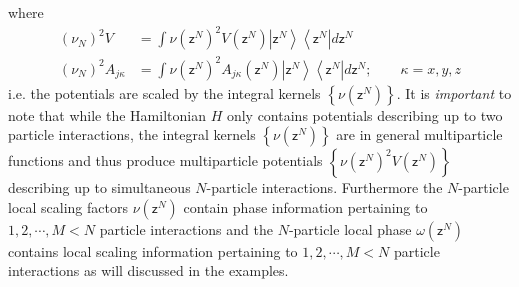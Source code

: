 \documentclass[aps,preprint]{revtex4}%
\begin{document}
where
\begin{align}
\left(  \nu_{N}\right)  ^{2}V &  =\int\nu\left(  \mathsf{z}^{N}\right)
^{2}V\left(  \mathsf{z}^{N}\right)  \left\vert \mathsf{z}^{N}\right\rangle
\left\langle \mathsf{z}^{N}\right\vert d\mathsf{z}^{N}\nonumber\\
\left(  \nu_{N}\right)  ^{2}A_{j\kappa} &  =\int\nu\left(  \mathsf{z}%
^{N}\right)  ^{2}A_{j\kappa}\left(  \mathsf{z}^{N}\right)  \left\vert
\mathsf{z}^{N}\right\rangle \left\langle \mathsf{z}^{N}\right\vert
d\mathsf{z}^{N};\qquad\kappa=x,y,z
\end{align}
i.e. the potentials are scaled by the integral kernels $\left\{  \nu\left(
\mathsf{z}^{N}\right)  \right\}  $. It is \emph{important }to note that while
the Hamiltonian $H$ only contains potentials describing up to two particle
interactions, the integral kernels $\left\{  \nu\left(  \mathsf{z}^{N}\right)
\right\}  $ are in general multiparticle functions and thus produce
multiparticle potentials $\left\{  \nu\left(  \mathsf{z}^{N}\right)
^{2}V\left(  \mathsf{z}^{N}\right)  \right\}  $ describing up to simultaneous
$N$-particle interactions. Furthermore the $N$-particle local scaling factors
$\nu\left(  \mathsf{z}^{N}\right)  $ contain phase information pertaining to
$1,2,\cdots,M<N$ particle interactions and the $N$-particle local phase
$\omega\left(  \mathsf{z}^{N}\right)  $ contains local scaling information
pertaining to $1,2,\cdots,M<N$ particle interactions as will discussed in the examples.
\end{document}
